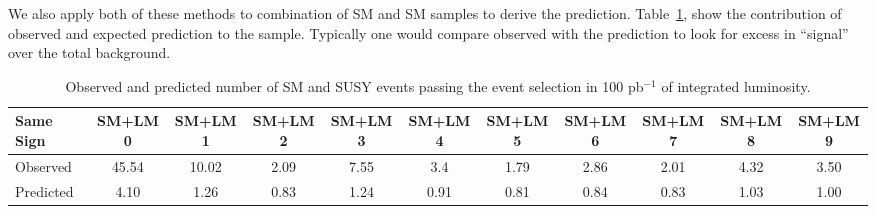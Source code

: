 We also apply both of these methods to combination of SM and SM samples to derive the
prediction. Table~\ref{tab:yieldsSUSY}, show the contribution of observed and expected prediction to 
the sample. Typically one would compare observed with the prediction to look for excess 
in ``signal'' over the total background.
\begin{table}[hbt]
\begin{center}
\small\addtolength{\tabcolsep}{-5pt}
\begin{tabular}{|l|c|c|c|c|c|c|c|c|c|c|}\hline
Same Sign  & SM+LM0 & SM+LM1 & SM+LM2 & SM+LM3 & SM+LM4 & SM+LM5 & SM+LM6 & SM+LM7 & SM+LM8 & SM+LM9 \\ \hline
Observed & 45.54 & 10.02 & 2.09 & 7.55 & 3.4 &	1.79 &	2.86 &	2.01 &	4.32 &	3.50 \\
Predicted & 4.10 & 1.26 & 0.83 & 1.24 &	0.91 &	0.81 &	0.84 &	0.83 &	1.03 &	1.00 \\ \hline
\end{tabular}
\caption{Observed and predicted  number of SM and SUSY events passing the event selection in 100 pb$^{-1}$ of integrated
luminosity.\label{tab:yieldsSUSY}}
\end{center}
\end{table}

\clearpage
